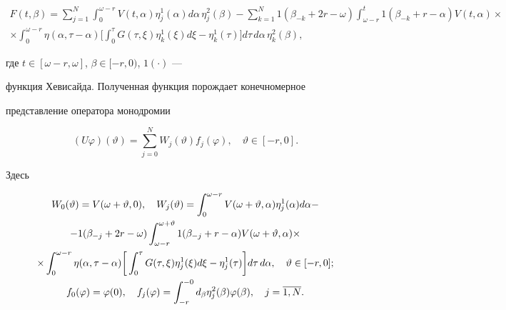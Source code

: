 \begin{multline*}


F(t, \beta) = \sum_{j=1}^{N} \int_{0}^{\omega-r}


V(t, \alpha) \eta_{j}^{1}(\alpha) d \alpha\, \eta_{j}^{2}(\beta) - 


\sum_{k=1}^{N} 1(\beta_{-k} + 2r - \omega) \int_{\omega-r}^{t}


1(\beta_{-k} + r - \alpha) V(t, \alpha) \times \\


%


\times \int_{0}^{\omega-r} \eta(\alpha, \tau - \alpha)


\bigg[\int_{0}^{\tau}G(\tau, \xi) \eta_{k}^{1}(\xi)


d \xi- \eta_{k}^{1}(\tau)\bigg]


d \tau\, d \alpha\, \eta_{k}^{2}(\beta), 


\end{multline*}


где $t \in[\omega-r, \omega]$, $\beta \in[-r,0)$, $1(\cdot)$ ---


функция Хевисайда. Полученная функция порождает конечномерное


представление оператора монодромии


$$


(U \varphi)(\vartheta) =


\sum_{j=0}^{N}W_{j}(\vartheta) f_{j}(\varphi),


\quad \vartheta \in[-r,0].


$$


Здесь


\begin{gather}


W_{0}(\vartheta) =V(\omega+ \vartheta,0),


\quad W_{j}(\vartheta) = \int_{0}^{\omega-r} V(\omega+ \vartheta,


\alpha) \eta_{j}^{1}(\alpha) d \alpha - \notag \\


%


- 1(\beta_{-j} + 2r - \omega)


\int_{\omega-r}^{\omega+ \vartheta} 1(\beta_{-j} + r - \alpha)


V(\omega+ \vartheta, \alpha) \times \notag \\


%


\times \int_{0}^{\omega-r} \eta(\alpha, \tau- \alpha)


\bigg[\int_{0}^{\tau} G(\tau, \xi) \eta_{j}^{1}(\xi) d \xi-


\eta_{j}^{1}(\tau)\bigg]


d \tau\, d \alpha,  \quad \vartheta \in[-r,0]; \\


f_{0}(\varphi) = \varphi(0),\quad f_{j}(\varphi) = \int_{-r}^{-0}


d_{\beta}


\eta_{j}^{2}(\beta) \varphi(\beta), \quad j= \overline{1,N}.\notag


\end{gather}






